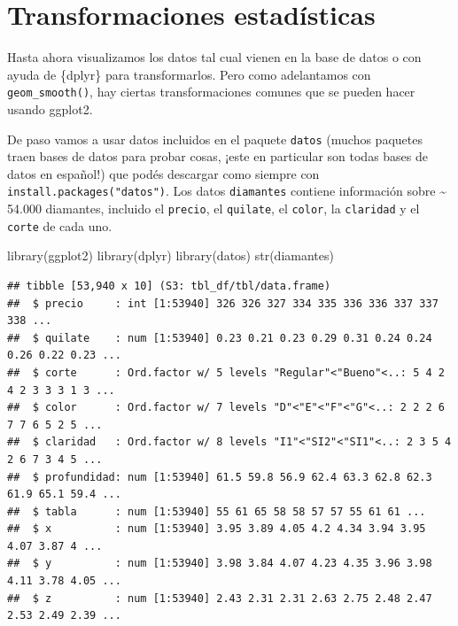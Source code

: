 \documentclass[
  openany]{book}
\newenvironment{Shaded}{\begin{snugshade}}{\end{snugshade}}
\newcommand{\FunctionTok}[1]{\textcolor[rgb]{0.00,0.00,0.00}{#1}}
\newcommand{\NormalTok}[1]{#1}
\begin{document}
\hypertarget{transformaciones-estaduxedsticas}{%
\section{Transformaciones estadísticas}\label{transformaciones-estaduxedsticas}}

Hasta ahora visualizamos los datos tal cual vienen en la base de datos o con ayuda de \{dplyr\} para transformarlos.
Pero como adelantamos con \texttt{geom\_smooth()}, hay ciertas transformaciones comunes que se pueden hacer usando ggplot2.

De paso vamos a usar datos incluidos en el paquete \texttt{datos} (muchos paquetes traen bases de datos para probar cosas, ¡este en particular son todas bases de datos en español!) que podés descargar como siempre con \texttt{install.packages("datos")}.
Los datos \texttt{diamantes} contiene información sobre \textasciitilde{} 54.000 diamantes, incluido el \texttt{precio}, el \texttt{quilate}, el \texttt{color}, la \texttt{claridad} y el \texttt{corte} de cada uno.

\begin{Shaded}
\begin{Highlighting}[]
\FunctionTok{library}\NormalTok{(ggplot2)}
\FunctionTok{library}\NormalTok{(dplyr)}
\FunctionTok{library}\NormalTok{(datos)}
\FunctionTok{str}\NormalTok{(diamantes)}
\end{Highlighting}
\end{Shaded}

\begin{verbatim}
## tibble [53,940 x 10] (S3: tbl_df/tbl/data.frame)
##  $ precio     : int [1:53940] 326 326 327 334 335 336 336 337 337 338 ...
##  $ quilate    : num [1:53940] 0.23 0.21 0.23 0.29 0.31 0.24 0.24 0.26 0.22 0.23 ...
##  $ corte      : Ord.factor w/ 5 levels "Regular"<"Bueno"<..: 5 4 2 4 2 3 3 3 1 3 ...
##  $ color      : Ord.factor w/ 7 levels "D"<"E"<"F"<"G"<..: 2 2 2 6 7 7 6 5 2 5 ...
##  $ claridad   : Ord.factor w/ 8 levels "I1"<"SI2"<"SI1"<..: 2 3 5 4 2 6 7 3 4 5 ...
##  $ profundidad: num [1:53940] 61.5 59.8 56.9 62.4 63.3 62.8 62.3 61.9 65.1 59.4 ...
##  $ tabla      : num [1:53940] 55 61 65 58 58 57 57 55 61 61 ...
##  $ x          : num [1:53940] 3.95 3.89 4.05 4.2 4.34 3.94 3.95 4.07 3.87 4 ...
##  $ y          : num [1:53940] 3.98 3.84 4.07 4.23 4.35 3.96 3.98 4.11 3.78 4.05 ...
##  $ z          : num [1:53940] 2.43 2.31 2.31 2.63 2.75 2.48 2.47 2.53 2.49 2.39 ...
\end{verbatim}
\end{document}
